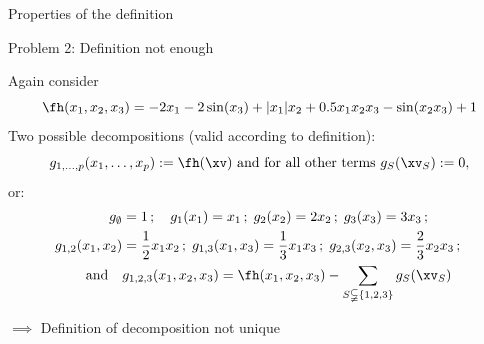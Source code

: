 \documentclass[10pt,compress,t,notes=noshow, xcolor=table]{beamer}
\begin{document}
\begin{framev}[align=top]{Properties of the definition}
\begin{itemizeM}
\end{itemizeM}
\end{framev}


\begin{framev}[align=top]{Problem 2: Definition not enough}
\begin{example}
Again consider
$$
\fh(x_1, x_2, x_3) = - 2x_1 - 2\sin(x_3) + |x_1|x_2 + 0.5 x_1 x_2 x_3 - \sin(x_2 x_3) + 1
$$
\pause
Two possible decompositions (valid according to definition):
$$
g_{1, \dots, p}(x_1, \dots, x_p) := \fh(\xv) \text{ and for all other terms } g_S(\xv_S) := 0 ,
$$
or:
\begin{align*}
g_\emptyset & = 1 \,;\quad
g_1(x_1) = x_1 \,;\;
g_2(x_2) = 2x_2 \,;\;
g_3(x_3) = 3x_3 \,;\quad \\
g_{1,2}(x_1, x_2) & = \frac{1}{2} x_1 x_2 \,;\;
g_{1,3}(x_1, x_3) = \frac{1}{3} x_1 x_3 \,;\;
g_{2,3}(x_2, x_3) = \frac{2}{3} x_2 x_3 \,;\; \\
\text{ and} \quad
& g_{1,2,3}(x_1, x_2, x_3) = \fh(x_1, x_2, x_3) - \sum_{S \subsetneqq \{1,2,3\}} g_S(\xv_S)
\end{align*}
\end{example}
\pause
\(\implies\) Definition of decomposition not unique \\
\end{framev}
\end{document}
